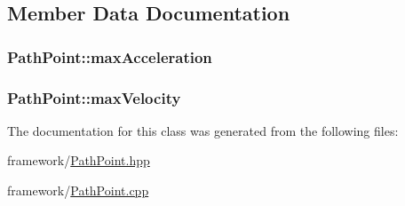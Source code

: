 \subsection{Member Data Documentation}
\hypertarget{classPathPoint_a70ea6c3945f895ebdfb34f8fa31b707e}{
\subsubsection[{max\-Acceleration}]{ Path\-Point\-::max\-Acceleration\hspace{0.3cm}{\ttfamily [private]}}}\label{classPathPoint_a70ea6c3945f895ebdfb34f8fa31b707e}
\hypertarget{classPathPoint_a1cc5f8871560f419edb85f24c6796613}{
\subsubsection[{max\-Velocity}]{ Path\-Point\-::max\-Velocity\hspace{0.3cm}{\ttfamily [private]}}}\label{classPathPoint_a1cc5f8871560f419edb85f24c6796613}


The documentation for this class was generated from the following files\-:\begin{DoxyCompactItemize}
\item 
framework/\hyperlink{PathPoint_8hpp}{Path\-Point.\-hpp}\item 
framework/\hyperlink{PathPoint_8cpp}{Path\-Point.\-cpp}\end{DoxyCompactItemize}
